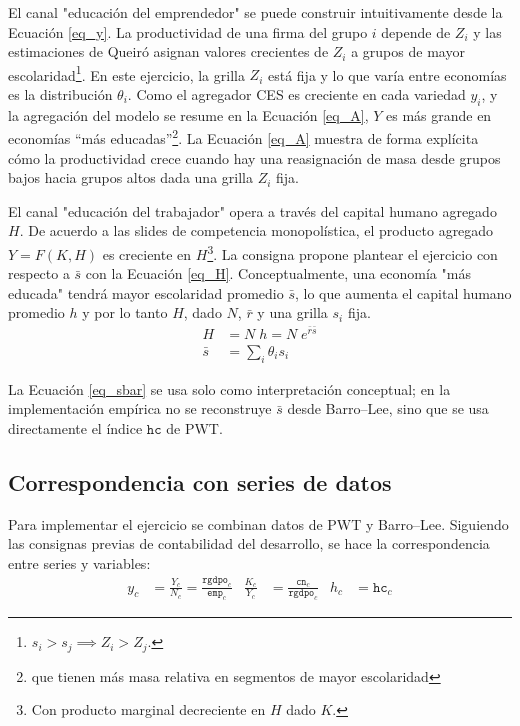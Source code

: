 El canal "educación del emprendedor" se puede construir intuitivamente desde la Ecuación \ref{eq_y}. La productividad de una firma del grupo $i$ depende de $Z_i$ y las estimaciones de Queiró asignan valores crecientes de $Z_i$ a grupos de mayor escolaridad\footnote{
	$s_i > s_j \implies Z_i > Z_j$.
}. En este ejercicio, la grilla $Z_i$ está fija y lo que varía entre economías es la distribución $\theta_i$. Como el agregador CES es creciente en cada variedad $y_i$, y la agregación del modelo se resume en la Ecuación \ref{eq_A}, $Y$ es más grande en economías ``más educadas''\footnote{que tienen más masa relativa en segmentos de mayor escolaridad}. La Ecuación \ref{eq_A} muestra de forma explícita cómo la productividad crece cuando hay una reasignación de masa desde grupos bajos hacia grupos altos dada una grilla $Z_i$ fija.

El canal "educación del trabajador" opera a través del capital humano agregado $H$. De acuerdo a las slides de competencia monopolística, el producto agregado $Y = F(K, H)$ es creciente en $H$\footnote{Con producto marginal decreciente en $H$ dado $K$.}. La consigna propone plantear el ejercicio con respecto a $\bar{s}$ con la Ecuación \ref{eq_H}. Conceptualmente, una economía "más educada" tendrá mayor escolaridad promedio $\bar{s}$, lo que aumenta el capital humano promedio $h$ y por lo tanto $H$, dado $N$, $\bar{r}$ y una grilla $s_i$ fija.
\begin{align}
	H &= N \; h = N \; e^{\bar{r} \bar{s}} \label{eq_H} \\ 
	\bar{s} &= \sum_i { \theta_i s_i } \label{eq_sbar}
\end{align}

La Ecuación \ref{eq_sbar} se usa solo como interpretación conceptual; en la implementación empírica no se reconstruye $\bar{s}$ desde Barro--Lee, sino que se usa directamente el índice $\texttt{hc}$ de PWT.

\subsection{Correspondencia con series de datos}

Para implementar el ejercicio se combinan datos de PWT y Barro--Lee. Siguiendo las consignas previas de contabilidad del desarrollo, se hace la correspondencia entre series y variables:
\begin{align*}
	y_c &= \frac{Y_c}{N_c} = \frac{\texttt{rgdpo}_c}{\texttt{emp}_c} &
	\frac{K_c}{Y_c} &= \frac{\texttt{cn}_c}{\texttt{rgdpo}_c} &
	h_c &= \texttt{hc}_c
\end{align*}

